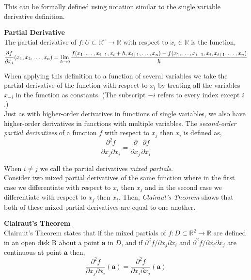 \documentclass[12pt]{article}
\begin{document}
This can be formally defined using notation similar to the single variable derivative definition. \\

\begin{framed}
\textbf{Partial Derivative} \\
The partial derivative of $f:U\subset\mathbb{R}^n\rightarrow\mathbb{R}$ with respect to $x_i\in\mathbb{R}$ is the function,
\[
\frac{\partial f}{\partial x_i}(x_1,x_2,\ldots,x_n) = \lim_{h\rightarrow0}
\frac{f(x_1,\ldots,x_{i-1},x_i+h,x_{i+1},\ldots,x_n) - f(x_1,\ldots,x_{i-1},x_i,x_{i+1},\ldots,x_n)}{h}
\]
\end{framed}

 When applying this definition to a function of several variables we take the partial derivative of the function with respect to $x_i$ by treating all the variables $x_{-i}$ in the function as constants. (The subscript $-i$ refers to every index except $i$.)\\

 Just as with higher-order derivatives in functions of single variables, we also have higher-order derivatives in functions with multiple variables. The \emph{second-order partial derivatives} of a function $f$ with respect to $x_j$ then $x_i$ is defined as,
\[
\frac{\partial^2f}{\partial x_j \partial x_i} = \frac{\partial}{\partial x_j}\frac{\partial f}{\partial x_i}
\]

 When $i\neq j$ we call the partial derivatives \emph{mixed partials}. \\

 Consider two mixed partial derivatives of the same function where in the first case we differentiate with respect to $x_i$ then $x_j$ and in the second case we differentiate with respect to $x_j$ then $x_i$. Then, \emph{Clairaut's Theorem} shows that both of these mixed partial derivatives are equal to one another. \\

\begin{framed}
\textbf{Clairaut's Theorem} \\
Clairaut's Theorem states that if the mixed partials of $f:D\subset\mathbb{R}^2\rightarrow\mathbb{R}$ are defined in an open disk B about a point $\mathbf{a}$ in $D$, and if $\partial^2f/\partial x_j\partial x_i$ and $\partial^2f/\partial x_i\partial x_j$ are continuous at point $\mathbf{a}$ then,
\[
\frac{\partial^2f}{\partial x_j\partial x_i}(\mathbf{a}) = 
\frac{\partial^2f}{\partial x_i\partial x_j}(\mathbf{a})
\]
\end{framed}
\end{document}
